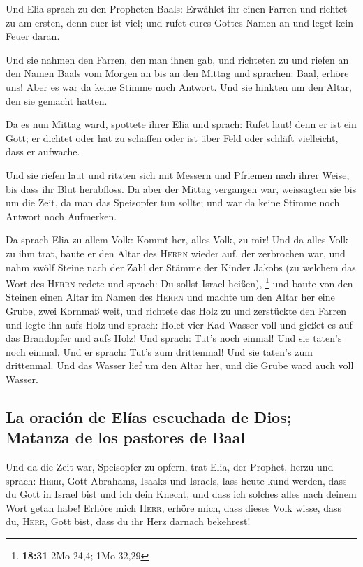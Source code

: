  Und Elia sprach zu den Propheten Baals: Erwählet ihr
einen Farren und richtet zu am ersten, denn euer ist viel; und rufet
eures Gottes Namen an und leget kein Feuer daran.

 Und sie nahmen den Farren, den man ihnen gab, und
richteten zu und riefen an den Namen Baals vom Morgen an bis an den
Mittag und sprachen: Baal, erhöre uns! Aber es war da keine Stimme noch
Antwort. Und sie hinkten um den Altar, den sie gemacht hatten.

 Da es nun Mittag ward, spottete ihrer Elia und sprach:
Rufet laut! denn er ist ein Gott; er dichtet oder hat zu schaffen oder
ist über Feld oder schläft vielleicht, dass er aufwache.

 Und sie riefen laut und ritzten sich mit Messern und
Pfriemen nach ihrer Weise, bis dass ihr Blut herabfloss. 
Da aber der Mittag vergangen war, weissagten sie bis um die Zeit, da man
das Speisopfer tun sollte; und war da keine Stimme noch Antwort noch
Aufmerken.

 Da sprach Elia zu allem Volk: Kommt her, alles Volk, zu
mir! Und da alles Volk zu ihm trat, baute er den Altar des
\textsc{Herrn} wieder auf, der zerbrochen war,  und nahm
zwölf Steine nach der Zahl der Stämme der Kinder Jakobs (zu welchem das
Wort des \textsc{Herrn} redete und sprach: Du sollst Israel heißen),
\footnote{\textbf{18:31} 2Mo 24,4; 1Mo 32,29}  und baute
von den Steinen einen Altar im Namen des \textsc{Herrn} und machte um
den Altar her eine Grube, zwei Kornmaß weit,  und
richtete das Holz zu und zerstückte den Farren und legte ihn aufs Holz
 und sprach: Holet vier Kad Wasser voll und gießet es auf
das Brandopfer und aufs Holz! Und sprach: Tut's noch einmal! Und sie
taten's noch einmal. Und er sprach: Tut's zum drittenmal! Und sie
taten's zum drittenmal.  Und das Wasser lief um den Altar
her, und die Grube ward auch voll Wasser.

\hypertarget{la-oraciuxf3n-de-eluxedas-escuchada-de-dios-matanza-de-los-pastores-de-baal}{%
\subsection{La oración de Elías escuchada de Dios; Matanza de los
pastores de
Baal}\label{la-oraciuxf3n-de-eluxedas-escuchada-de-dios-matanza-de-los-pastores-de-baal}}

 Und da die Zeit war, Speisopfer zu opfern, trat Elia,
der Prophet, herzu und sprach: \textsc{Herr}, Gott Abrahams, Isaaks und
Israels, lass heute kund werden, dass du Gott in Israel bist und ich
dein Knecht, und dass ich solches alles nach deinem Wort getan habe!
 Erhöre mich \textsc{Herr}, erhöre mich, dass dieses Volk
wisse, dass du, \textsc{Herr}, Gott bist, dass du ihr Herz darnach
bekehrest!


